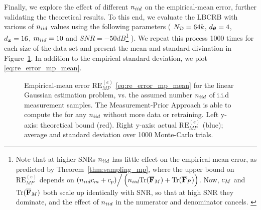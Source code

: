 {{Finally, we explore the effect of different $n_{iid}$ on the empirical-mean error, further validating the theoretical results. To this end,
we evaluate the LBCRB with various of $n_{iid}$ values using the following parameters 
(
$N_{\mathcal{D}}=64k$, ${d_{\bm{\theta}}}=4$, ${d_{\bm{x}}}=16$, %
{$m_{iid}=10$} and $SNR=-50dB$\footnote{
Note that at  higher SNRs $n_{iid}$ has little  effect on the empirical-mean error, 
{%
as predicted by
} Theorem~\ref{thm:sampling_mp}, 
where the upper bound on {$\mathrm{RE}_{MP}^{(e)}$ depends on %
 $(n_{iid} c_m+c_p)\Big/ \left(n_{iid}\mathrm{Tr}(\overline{\mathbf{F}}_{M})+\mathrm{Tr}(\overline{\mathbf{F}}_{P}) \right) $. Now, $c_M$ and $\mathrm{Tr}(\overline{\mathbf{F}}_{M})$ both scale up identically with SNR, so that at high SNR they dominate, and the effect of $n_{iid}$ %
 in the numerator and denominator cancels.
} 
}  
). 
%
We repeat this process 1000 times for each size of the data set and present the mean and standard divination in Figure~\ref{fig:sample_error_vs_n_iid}. In addition to the empirical standard deviation, we plot
\eqref{eq:re_error_mp_mean}.  }
\begin{figure}
    \centering
    
    \caption{
    {%
    Empirical-mean \name{} error $\mathrm{RE}_{MP}^{(e)}$ \eqref{eq:re_error_mp_mean} 
     for the linear Gaussian estimation problem,  vs. the assumed number $n_{iid}$ of i.i.d measurement samples.
        The Measurement-Prior Approach is able to compute the \name{} for 
    any  $n_{iid}$ %
    without more data or retraining.   
    Left y-axis:  theoretical bound (red). %
    Right y-axis:  actual $\mathrm{RE}_{MP}^{(e)}$ %
    (blue); average and standard deviation over 1000 Monte-Carlo trials.%
    }
    }
    \label{fig:sample_error_vs_n_iid}
\end{figure}

}

